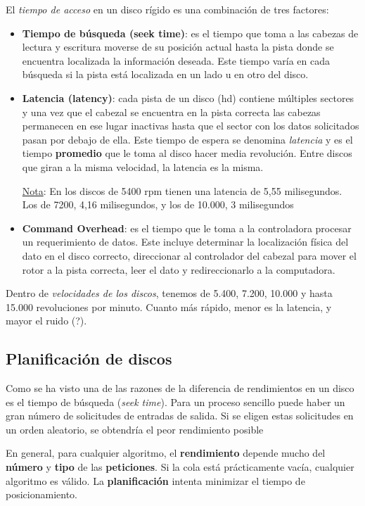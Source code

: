 \documentclass[10pt,a4paper]{article}
\begin{document}
El \textit{tiempo de acceso} en un disco rígido es una combinación de tres factores:
\begin{itemize}
\item \textbf{Tiempo de búsqueda (seek time)}: es el tiempo que toma a las cabezas de lectura y escritura moverse de su posición actual hasta la pista donde se encuentra localizada la información deseada. Este tiempo varía en cada búsqueda si la pista está localizada en un lado u en otro del disco.
\item \textbf{Latencia (latency)}: cada pista de un disco (hd) contiene múltiples sectores y una vez que el cabezal se encuentra en la pista correcta las cabezas permanecen en ese lugar inactivas hasta que el sector con los datos solicitados pasan por debajo de ella. Este tiempo de espera se denomina \textit{latencia} y es el tiempo \textbf{promedio} que le toma al disco hacer media revolución. Entre discos que giran a la misma velocidad, la latencia es la misma.

\underline{Nota}: En los discos de 5400 rpm tienen una latencia de 5,55 milisegundos. Los de 7200, 4,16 milisegundos, y los de 10.000, 3 milisegundos
\item \textbf{Command Overhead}: es el tiempo que le toma a la controladora procesar un requerimiento de datos. Este incluye determinar la localización física del dato en el disco correcto, direccionar al controlador del cabezal para mover el rotor a la pista correcta, leer el dato y redireccionarlo a la computadora.
\end{itemize}

Dentro de \textit{velocidades de los discos}, tenemos de 5.400, 7.200, 10.000 y hasta 15.000 revoluciones por minuto. Cuanto más rápido, menor es la latencia, y mayor el ruido (?).

\subsection{Planificación de discos}
Como se ha visto una de las razones de la diferencia de rendimientos en un disco es el tiempo de búsqueda (\textit{seek time}). Para un proceso sencillo puede haber un gran número de solicitudes de entradas de salida. Si se eligen estas solicitudes en un orden aleatorio, se obtendría el peor rendimiento posible

En general, para cualquier algoritmo, el \textbf{rendimiento} depende mucho del \textbf{número} y \textbf{tipo} de las \textbf{peticiones}. Si la cola está prácticamente vacía, cualquier algoritmo es válido. La \textbf{planificación} intenta minimizar el tiempo de posicionamiento.
\end{document}
